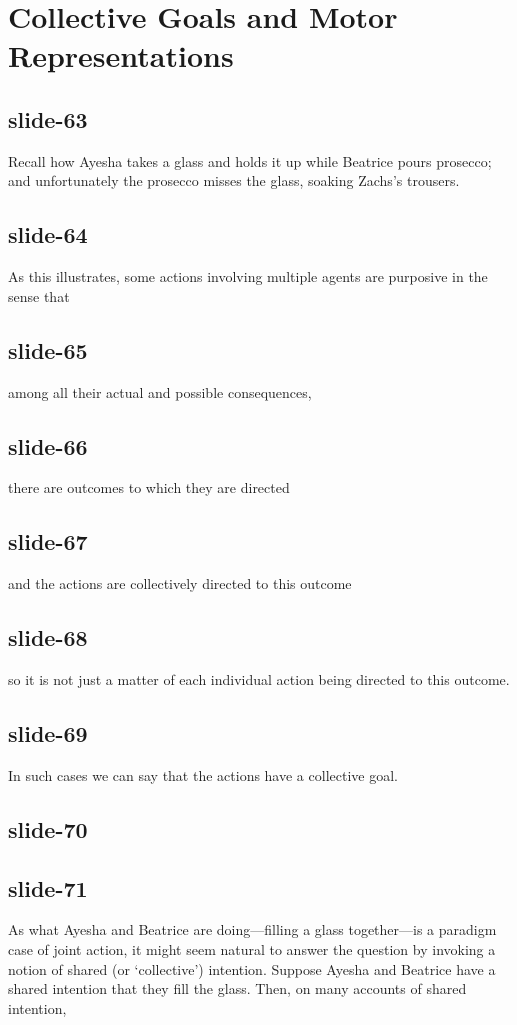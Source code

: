 \documentclass[12pt,\papersize]{extarticle}
\begin{document}
\section{Collective Goals and Motor Representations}

\subsection{slide-63}
Recall how Ayesha takes a glass and holds it up while Beatrice pours prosecco;
and unfortunately the prosecco misses the glass, soaking Zachs’s trousers.

\subsection{slide-64}
As this illustrates,
some actions involving multiple agents are purposive in the sense that

\subsection{slide-65}
among all their actual and possible consequences,

\subsection{slide-66}
there are outcomes to which they are directed

\subsection{slide-67}
and the actions are collectively directed to this outcome

\subsection{slide-68}
so it is not just a matter of each individual action being directed to this outcome.

\subsection{slide-69}
In such cases we can say that the actions have a collective goal.

\subsection{slide-70}

\subsection{slide-71}
As what Ayesha and Beatrice are doing---filling a glass together---is a paradigm case of joint action, it might seem natural to answer the question by invoking a notion of shared (or `collective') intention.
Suppose Ayesha and Beatrice have a shared intention that they fill the glass.
Then, on many accounts of shared intention,
\end{document}
